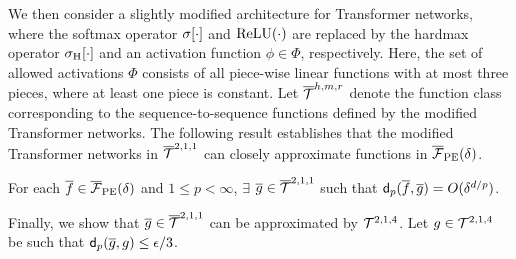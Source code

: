 

\vspace{-2pt}
We then consider a slightly modified architecture for Transformer networks, where the softmax operator $\sigma[\cdot]$ and ${\rm ReLU}(\cdot)$ are replaced by the hardmax operator $\sigma_{\rm H}[\cdot]$ and an activation function $\phi \in \Phi$, respectively. Here, the set of allowed activations $\Phi$ consists of all piece-wise linear functions with at most three pieces, where at least one piece is constant. Let $\overline{\mathcal{T}}^{h, m, r}$ denote the function class corresponding to the sequence-to-sequence functions defined by the modified Transformer networks. The following result establishes that the modified Transformer networks in $\overline{\mathcal{T}}^{2, 1, 1}$ can closely approximate functions in $\overline {\mathcal{F}}_{\rm PE}(\delta)$.

\begin{proposition}
\label{prop:part2}
For each $\overline f \in \overline {\mathcal{F}}_{\rm PE} (\delta)$ and $1\leq p < \infty$, $\exists$ $\overline g \in \overline {\mathcal{T}}^{2,1,1}$ such that $\mathsf{d}_p(\overline f, \overline g) = O(\delta^{d/p})$.
\end{proposition}

\vspace{-2pt}
Finally, we show that $\overline{g} \in \overline {\mathcal{T}}^{2,1,1}$ can be approximated by $\mathcal{T}^{2, 1, 4}$. Let $g \in {\mathcal{T}}^{2,1,4}$ be such that $\mathsf{d}_{p}(\overline{g}, g)\leq \epsilon/3$.


